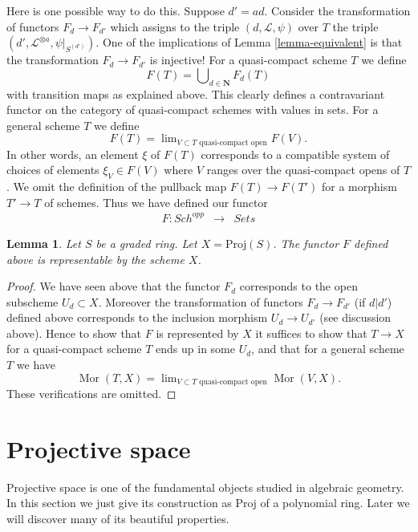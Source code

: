 \documentclass{stacks-project}
\theoremstyle{plain}
\newtheorem{lemma}[subsection]{Lemma}
\theoremstyle{definition}
\theoremstyle{remark}
\numberwithin{equation}{subsection}
\def\lim{\mathop{\mathrm{lim}}\nolimits}
\def\Sch{\mathit{Sch}}
\def\Mor{\mathop{\mathrm{Mor}}\nolimits}
\begin{document}
\medskip\noindent
Here is one possible way to do this. Suppose $d' = ad$.
Consider the transformation of functors $F_d \to F_{d'}$
which assigns to the triple $(d, \mathcal{L}, \psi)$ over
$T$ the triple $(d', \mathcal{L}^{\otimes a}, \psi|_{S^{(d')}})$.
One of the implications of Lemma \ref{lemma-equivalent} is that the
transformation $F_d \to F_{d'}$ is injective!
For a quasi-compact scheme $T$ we define
$$
F(T) = \bigcup\nolimits_{d \in \mathbf{N}} F_d(T)
$$
with transition maps as explained above. This clearly defines a
contravariant functor on the category of quasi-compact schemes
with values in sets. For a general scheme
$T$ we define
$$
F(T)
=
\lim_{V \subset T\text{ quasi-compact open}} F(V).
$$
In other words, an element $\xi$ of $F(T)$ corresponds to a compatible system
of choices of elements $\xi_V \in F(V)$ where $V$ ranges over the
quasi-compact opens of $T$.
We omit the definition of the pullback map $F(T) \to F(T')$
for a morphism $T' \to T$ of schemes.
Thus we have defined our functor
\begin{eqnarray*}
F : \Sch^{opp} & \longrightarrow & \textit{Sets}
\end{eqnarray*}

\begin{lemma}
\label{lemma-proj-functor}
Let $S$ be a graded ring.
Let $X = \text{Proj}(S)$.
The functor $F$ defined above is representable by the scheme $X$.
\end{lemma}

\begin{proof}
We have seen above that the functor $F_d$ corresponds to the
open subscheme $U_d \subset X$. Moreover the transformation
of functors $F_d \to F_{d'}$ (if $d | d'$) defined above
corresponds to the inclusion morphism $U_d \to U_{d'}$
(see discussion above). Hence to show that $F$ is represented
by $X$ it suffices to show that $T \to X$ for a quasi-compact
scheme $T$ ends up in some $U_d$, and that for a general scheme
$T$ we have
$$
\Mor(T, X)
=
\lim_{V \subset T\text{ quasi-compact open}} \Mor(V, X).
$$
These verifications are omitted.
\end{proof}







\section{Projective space}
\label{section-projective-space}

\noindent
Projective space is one of the fundamental objects studied in
algebraic geometry. In this section we just give its construction
as $\text{Proj}$ of a polynomial ring. Later we will discover many
of its beautiful properties.
\end{document}
